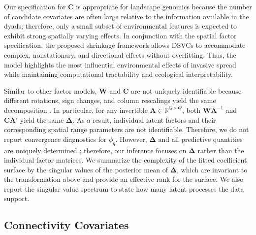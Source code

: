 \documentclass{article}
\begin{document}
Our specification for $\mathbf{C}$ is appropriate for landscape genomics because the number of candidate covariates are often large relative to the information available in the dyads; therefore, only a small subset of environmental features is expected to exhibit strong spatially varying effects. 
In conjunction with the spatial factor specification, the proposed shrinkage framework allows DSVCs to accommodate complex, nonstationary, and directional effects without overfitting. Thus, the model highlights the most influential environmental effects of invasive spread while maintaining computational tractability and ecological interpretability.

Similar to other factor models, $\mathbf{W}$ and $\mathbf{C}$ are not uniquely identifiable because different rotations, sign changes, and column rescalings yield the same decomposition \citep{lopes2004bayesian,ren2013hierarchical,papastamoulis2022identifiability}. 
In particular, for any invertible $\mathbf{A}\in\mathbb{R}^{Q\times Q}$, both $\mathbf{WA}^{-1}$ and $\mathbf{CA}'$ yield the same $\boldsymbol{\Delta}$. As a result,  individual latent factors and their corresponding spatial range parameters are not identifiable. Therefore, we do not report convergence diagnostics for $\phi_q$.
However, $\boldsymbol\Delta$ and all predictive quantities are uniquely determined \citep{zhang2022spatial}; therefore, our inference focuses on $\boldsymbol\Delta$ rather than the individual factor matrices.
We summarize the complexity of the fitted coefficient surface by the singular values of the posterior mean of $\boldsymbol{\Delta}$, which are invariant to the transformation above and provide an effective rank for the surface. We also report the singular value spectrum to state how many latent processes the data support. %

\subsection{Connectivity Covariates}
\label{sec:CC}
\end{document}
